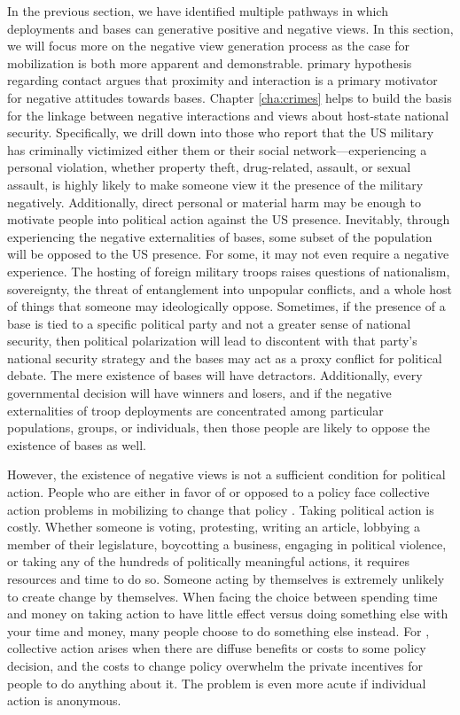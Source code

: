 {	In the previous section, we have identified multiple pathways in which deployments and bases can generative positive and negative views. In this section, we will focus more on the negative view generation process as the case for mobilization is both more apparent and demonstrable.  primary hypothesis regarding contact argues that proximity and interaction is a primary motivator for negative attitudes towards bases. Chapter \ref{cha:crimes} helps to build the basis for the linkage between negative interactions and views about host-state national security. Specifically, we drill down into those who report that the US military has criminally victimized either them or their social network---experiencing a personal violation, whether property theft, drug-related, assault, or sexual assault, is highly likely to make someone view it the presence of the military negatively. Additionally, direct personal or material harm may be enough to motivate people into political action against the US presence. Inevitably, through experiencing the negative externalities of bases, some subset of the population will be opposed to the US presence. For some, it may not even require a negative experience. The hosting of foreign military troops raises questions of nationalism, sovereignty, the threat of entanglement into unpopular conflicts, and a whole host of things that someone may ideologically oppose. Sometimes, if the presence of a base is tied to a specific political party and not a greater sense of national security, then political polarization will lead to discontent with that party's national security strategy and the bases may act as a proxy conflict for political debate. The mere existence of bases will have detractors. Additionally, every governmental decision will have winners and losers, and if the negative externalities of troop deployments are concentrated among particular populations, groups, or individuals, then those people are likely to oppose the existence of bases as well. 
	
	
	However, the existence of negative views is not a sufficient condition for political action. People who are either in favor of or opposed to a policy face collective action problems in mobilizing to change that policy \cite{Olson1965}. Taking political action is costly. Whether someone is voting, protesting, writing an article, lobbying a member of their legislature, boycotting a business, engaging in political violence, or taking any of the hundreds of politically meaningful actions, it requires resources and time to do so. Someone acting by themselves is extremely unlikely to create change by themselves. When facing the choice between spending time and money on taking action to have little effect versus doing something else with your time and money, many people choose to do something else instead. For , collective action arises when there are diffuse benefits or costs to some policy decision, and the costs to change policy overwhelm the private incentives for people to do anything about it. The problem is even more acute if individual action is anonymous. 
	
}
